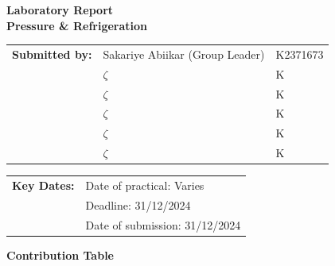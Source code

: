 \documentclass{article}
\begin{document}
	
	\vspace*{\fill}
	\begin{center}
		\textbf{\Huge Laboratory Report}\\[10pt]
		\LARGE \textbf{Pressure \& Refrigeration}
	\end{center}
	\vspace*{\fill}
	
	\Large    
	\begin{tabular}{@{}l l l@{}}
		\textbf{Submitted by:} & Sakariye Abiikar (Group Leader)\phantom{ssssss} & K2371673 \\
		& $\zeta$~ & K~ \\
		& $\zeta$~ &  K~ \\
		& $\zeta$~ & K~ \\
		& $\zeta$~ & K~ \\
		& $\zeta$~ & K~ \\   
	\end{tabular}
	
	\vspace*{\fill}
	
	\begin{tabular}{@{}l l@{}}
		\textbf{Key Dates:} & Date of practical: Varies\\
		& Deadline: 31/12/2024 \\
		& Date of submission: 31/12/2024\\
	\end{tabular}
	\vspace*{\fill}
	
	\large
	\newpage\noindent\vspace{2em}
	\begin{center}
		\LARGE \textbf{Contribution Table}\\[3em]
	\end{center}
	
	
	
\end{document}
